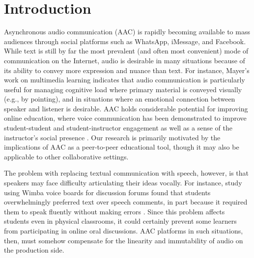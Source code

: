 \section{Introduction}

Asynchronous audio communication (AAC) is rapidly becoming available to mass audiences through social platforms such as WhatsApp, iMessage, and Facebook. 
While text is still by far the most prevalent (and often most convenient) mode of communication on the Internet, audio is desirable in many situations because of its ability to convey more expression and nuance than text.
For instance, Mayer's work on multimedia learning \cite{mayer} indicates that audio communication is particularly useful for managing cognitive load where primary material is conveyed visually (e.g., by pointing), and in situations where an emotional connection between speaker and listener is desirable.
AAC holds considerable potential for improving online education, where voice communication has been demonstrated to improve student-student and student-instructor engagement as well as a sense of the instructor's social presence \cite{ice,oomen,tu}. 
Our research is primarily motivated by the implications of AAC as a peer-to-peer educational tool, though it may also be applicable to other collaborative settings.

The problem with replacing textual communication with speech, however, is that speakers may face difficulty articulating their ideas vocally.
For instance,  study using Wimba voice boards for discussion forums found that students overwhelmingly preferred text over speech comments, in part because it required them to speak fluently without making errors \cite{wimba}.
Since this problem affects students even in physical classrooms, it could certainly prevent some learners from participating in online oral discussions.
AAC platforms in such situations, then, must somehow compensate for the linearity and immutability of audio on the production side.

